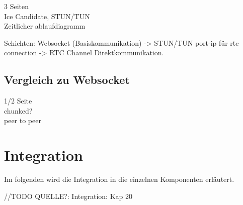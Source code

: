 \label{sec:Funktion}
3 Seiten\\

Ice Candidate, STUN/TUN \\
Zeitlicher ablaufdiagramm


Schichten: Websocket (Basiskommunikation) -> STUN/TUN port-ip für rtc connection -> RTC Channel Direktkommunikation.




   

\section{Vergleich zu Websocket}
\label{sec:Vergleich zu Websocket}
1/2 Seite\\

chunked?\\
peer to peer\\


\chapter{Integration}
\label{cha:chapter}
Im folgenden wird die Integration in die einzelnen Komponenten erläutert.

//TODO QUELLE?: 
Integration: Kap 20 \cite{Methoden und Architekturen der Softwaretechnik}

